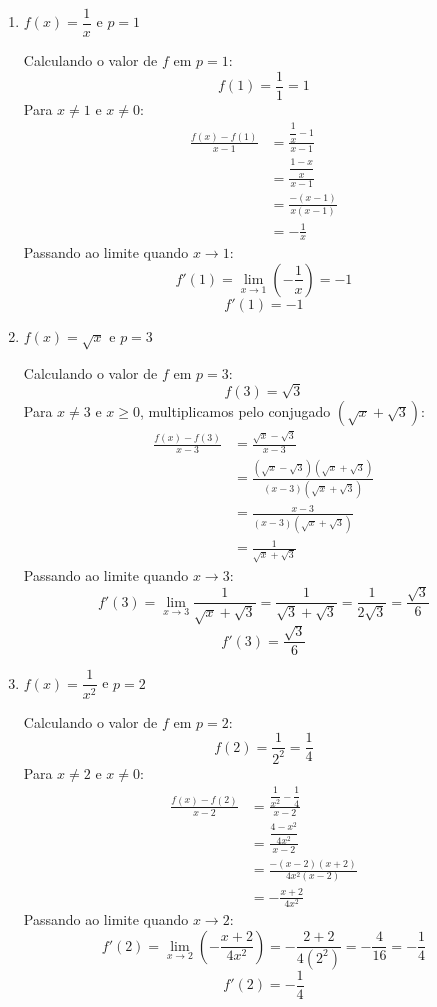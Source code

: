 \begin{enumerate}[label=\alph*)]
    \item $f(x) = \dfrac{1}{x}$ e $p = 1$

    Calculando o valor de $f$ em $p = 1$:
    \[
    f(1) = \frac{1}{1} = 1
    \]
    Para $x \neq 1$ e $x \neq 0$:
    \begin{align*}
        \frac{f(x) - f(1)}{x - 1} &= \frac{\dfrac{1}{x} - 1}{x - 1} \\[0.20cm]
        &= \frac{\dfrac{1 - x}{x}}{x - 1} \\[0.20cm]
        &= \frac{-(x - 1)}{x(x - 1)} \\[0.20cm]
        &= -\frac{1}{x}
    \end{align*}
    Passando ao limite quando $x \to 1$:
    \[
    f'(1) = \lim_{x \to 1} \left(-\frac{1}{x}\right) = -1
    \]
    \[
    f'(1) = -1
    \]

    \item $f(x) = \sqrt{x}$ e $p = 3$

    Calculando o valor de $f$ em $p = 3$:
    \[
    f(3) = \sqrt{3}
    \]
    Para $x \neq 3$ e $x \ge 0$, multiplicamos pelo conjugado $(\sqrt{x} + \sqrt{3})$:
    \begin{align*}
        \frac{f(x) - f(3)}{x - 3} &= \frac{\sqrt{x} - \sqrt{3}}{x - 3} \\[0.20cm]
        &= \frac{(\sqrt{x} - \sqrt{3})(\sqrt{x} + \sqrt{3})}{(x - 3)(\sqrt{x} + \sqrt{3})} \\[0.20cm]
        &= \frac{x - 3}{(x - 3)(\sqrt{x} + \sqrt{3})} \\[0.20cm]
        &= \frac{1}{\sqrt{x} + \sqrt{3}}
    \end{align*}
    Passando ao limite quando $x \to 3$:
    \[
    f'(3) = \lim_{x \to 3} \frac{1}{\sqrt{x} + \sqrt{3}} = \frac{1}{\sqrt{3} + \sqrt{3}} = \frac{1}{2\sqrt{3}} = \frac{\sqrt{3}}{6}
    \]
    \[
    f'(3) = \frac{\sqrt{3}}{6}
    \]

    \item $f(x) = \dfrac{1}{x^2}$ e $p = 2$

    Calculando o valor de $f$ em $p = 2$:
    \[
    f(2) = \frac{1}{2^2} = \frac{1}{4}
    \]
    Para $x \neq 2$ e $x \neq 0$:
    \begin{align*}
        \frac{f(x) - f(2)}{x - 2} &= \frac{\dfrac{1}{x^2} - \dfrac{1}{4}}{x - 2} \\[0.20cm]
        &= \frac{\dfrac{4 - x^2}{4x^2}}{x - 2} \\[0.20cm]
        &= \frac{-(x - 2)(x + 2)}{4x^2(x - 2)} \\[0.20cm]
        &= -\frac{x + 2}{4x^2}
    \end{align*}
    Passando ao limite quando $x \to 2$:
    \[
    f'(2) = \lim_{x \to 2} \left(-\frac{x + 2}{4x^2}\right) = -\frac{2 + 2}{4(2^2)} = -\frac{4}{16} = -\frac{1}{4}
    \]
    \[
    f'(2) = -\frac{1}{4}
    \]


\end{enumerate}
